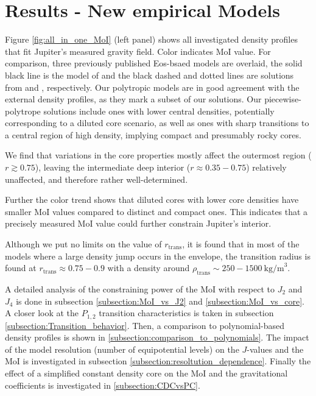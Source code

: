 \documentclass[usenatbib]{mnras}
\newcommand{\sub}[1]{_{\text{#1}}}
\begin{document}
\section{Results - New empirical Models} \label{sec:results}
Figure \ref{fig:all_in_one_MoI} (left panel) shows all investigated density profiles that fit Jupiter's measured gravity field. Color indicates MoI value. For comparison, three previously published Eos-bsaed models are overlaid, the solid black line is the model of \citet{Debras_2019} and the black dashed and dotted lines are solutions from \cite{2017Wahl} and \citet{Miguel2016}, respectively. Our polytropic models are in good agreement with the external density profiles, as they mark a subset of our solutions. Our piecewise-polytrope solutions include ones with lower central densities, potentially corresponding to a diluted core scenario, as well as ones with sharp transitions to a central region of high density, implying compact and presumably rocky cores.

We find that variations in the core properties mostly affect the outermost region ($r \gtrsim 0.75$), leaving the intermediate deep interior ($r \approx 0.35-0.75$) relatively unaffected, and therefore rather well-determined. 

Further the color trend shows that diluted cores with lower core densities have smaller MoI values compared to distinct and compact ones. This indicates that a precisely measured MoI value could further constrain Jupiter's interior. 

Although we put no limits on the value of $r\sub{trans}$, it is found that in most of the models where a large density jump occurs in the envelope, the transition radius is found at $r\sub{trans} \approx 0.75-0.9$ with a density around $\rho\sub{trans} \sim 250 -1500~\text{kg/m}^3$.

A detailed analysis of the constraining power of the MoI with respect to $J_2$ and $J_4$ is done in subsection \ref{subsection:MoI_vs_J2} and \ref{subsection:MoI_vs_core}. A closer look at the $P_{1,2}$ transition characteristics is taken in subsection \ref{subsection:Transition_behavior}. Then, a comparison to polynomial-based density profiles is shown in \ref{subsection:comparison_to_polynomials}. The impact of the model resolution (number of equipotential levels) on the $J$-values and the MoI is investigated in subsection \ref{subsection:resoltution_dependence}. Finally the effect of a simplified constant density core on the MoI and the gravitational coefficients is investigated in \ref{subsection:CDCvsPC}.
\end{document}
